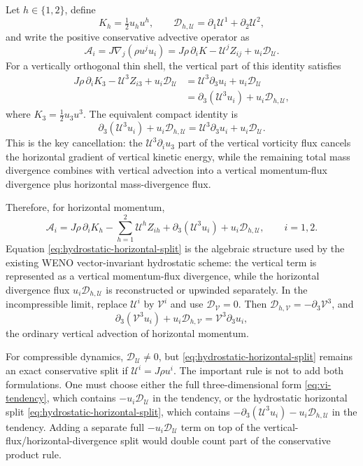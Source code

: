 \documentclass[11pt]{article}
\newcommand{\pd}{\partial}
\newcommand{\half}{\tfrac{1}{2}}
\newcommand{\mc}[1]{\mathcal{#1}}
\newcommand{\Div}{\mc{D}}
\newcommand{\Vflux}{\mc{V}}
\newcommand{\Uflux}{\mc{U}}
\newcommand{\Dvol}{\Div_{\Vflux}}
\newcommand{\Dmass}{\Div_{\Uflux}}
\newcommand{\Dhvol}{\Div_{h,\Vflux}}
\newcommand{\Dhmass}{\Div_{h,\Uflux}}
\begin{document}
Let \(h\in\{1,2\}\), define
\begin{equation}
  K_h = \half u_h u^h,
  \qquad
  \Dhmass = \pd_1 \Uflux^1 + \pd_2 \Uflux^2,
\end{equation}
and write the positive conservative advective operator as
\begin{equation}
  \mathcal A_i = J\nabla_j(\rho u^j u_i)
  = J\rho\,\pd_i K - \Uflux^j Z_{ij} + u_i \Dmass.
\end{equation}
For a vertically orthogonal thin shell, the vertical part of this identity satisfies
\begin{align}
  J\rho\,\pd_i K_3 - \Uflux^3 Z_{i3} + u_i \Dmass
  &= \Uflux^3 \pd_3 u_i + u_i \Dmass \\
  &= \pd_3(\Uflux^3 u_i) + u_i \Dhmass,
  \label{eq:vertical-flux-horizontal-divergence-split}
\end{align}
where \(K_3=\half u_3u^3\).  The equivalent compact identity is
\begin{equation}
  \pd_3(\Uflux^3u_i) + u_i\Dhmass
  = \Uflux^3\pd_3u_i + u_i\Dmass.
  \label{eq:compact-vertical-split}
\end{equation}
This is the key cancellation: the \(\Uflux^3\pd_i u_3\) part of the vertical vorticity flux cancels the horizontal gradient of vertical kinetic energy, while the remaining total mass divergence combines with vertical advection into a vertical momentum-flux divergence plus horizontal mass-divergence flux.

Therefore, for horizontal momentum,
\begin{equation}
  \mathcal A_i
  = J\rho\,\pd_i K_h
    - \sum_{h=1}^2 \Uflux^h Z_{ih}
    + \pd_3(\Uflux^3 u_i)
    + u_i \Dhmass,
  \qquad i=1,2.
  \label{eq:hydrostatic-horizontal-split}
\end{equation}
Equation \eqref{eq:hydrostatic-horizontal-split} is the algebraic structure used by the existing WENO vector-invariant hydrostatic scheme: the vertical term is represented as a vertical momentum-flux divergence, while the horizontal divergence flux \(u_i\Dhmass\) is reconstructed or upwinded separately.  In the incompressible limit, replace \(\Uflux^i\) by \(\Vflux^i\) and use \(\Dvol=0\).  Then \(\Dhvol=-\pd_3\Vflux^3\), and
\begin{equation}
  \pd_3(\Vflux^3u_i)+u_i\Dhvol = \Vflux^3\pd_3u_i,
\end{equation}
the ordinary vertical advection of horizontal momentum.

For compressible dynamics, \(\Dmass\ne0\), but \eqref{eq:hydrostatic-horizontal-split} remains an exact conservative split if \(\Uflux^i=J\rho u^i\).  The important rule is not to add both formulations.  One must choose either the full three-dimensional form \eqref{eq:vi-tendency}, which contains \(-u_i\Dmass\) in the tendency, or the hydrostatic horizontal split \eqref{eq:hydrostatic-horizontal-split}, which contains \(-\pd_3(\Uflux^3u_i)-u_i\Dhmass\) in the tendency.  Adding a separate full \(-u_i\Dmass\) term on top of the vertical-flux/horizontal-divergence split would double count part of the conservative product rule.
\end{document}

